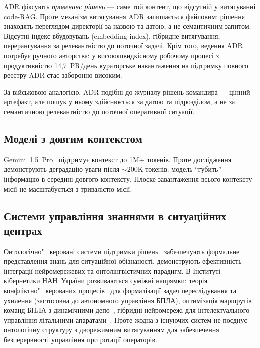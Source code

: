 \documentclass[11pt]{article}
\begin{document}
ADR фіксують \emph{провенанс рішень} --- саме той контент, що відсутній у витягуванні code-RAG.
Проте механізм витягування ADR залишається файловим: рішення знаходять переглядом директорії за назвою та датою, а не семантичним запитом.
Відсутні індекс вбудовувань (embedding index), гібридне витягування, перерангування за релевантністю до поточної задачі.
Крім того, ведення ADR потребує ручного авторства: у високошвидкісному робочому процесі з продуктивністю 14,7~PR/день кураторське навантаження на підтримку повного реєстру ADR стає заборонно високим.

За військовою аналогією, ADR подібні до журналу рішень командира --- цінний артефакт, але пошук у ньому здійснюється за датою та підрозділом, а не за семантичною релевантністю до поточної оперативної ситуації.

\subsection{Моделі з довгим контекстом}

Gemini~1.5~Pro~\citep{reid2024gemini} підтримує контекст до 1M+ токенів.
Проте дослідження~\citep{liu2023lost, hsieh2024ruler, li2024longcontextbench} демонструють деградацію уваги після ${\sim}200$K токенів: модель ``губить'' інформацію в середині довгого контексту.
Плоске завантаження всього контексту місії не масштабується з тривалістю місії.

\subsection{Системи управління знаннями в ситуаційних центрах}

Онтологічно"=керовані системи підтримки рішень~\citep{palagin2006architecture} забезпечують формальне представлення знань для ситуаційної обізнаності.
\citet{palagin2024neural} демонструють ефективність інтеграції нейромережевих та онтолінгвістичних парадигм.
В Інституті кібернетики НАН~України розвиваються суміжні напрямки: теорія конфліктно"=керованих процесів~\citep{chikrii1997conflict} для формалізації задач переслідування та ухилення (застосовна до автономного управління БПЛА), оптимізація маршрутів команд БПЛА з динамічними депо~\citep{horbulin2020uavroutes}, гібридні нейромережі для інтелектуального управління літальними апаратами~\citep{zgurovsky2021hybridnn}.
Проте жодна з існуючих систем не поєднує онтологічну структуру з дворежимним витягуванням для забезпечення безперервності управління при ротації операторів.
\end{document}
